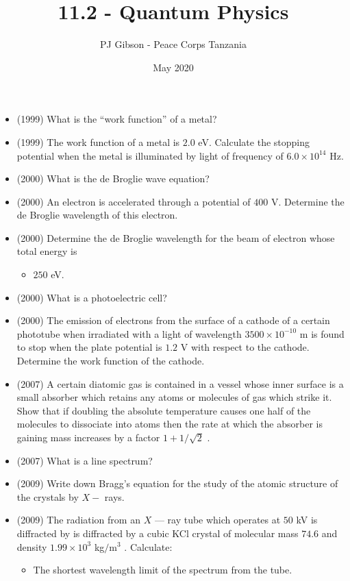 \documentclass{article}
\title{\textbf{11.2 - Quantum Physics}}
\author{PJ Gibson - Peace Corps Tanzania}
\date{May 2020}
\begin{document}
\maketitle

\begin{itemize}
\item (1999)  What is the “work function” of a metal?
\item (1999)  The work function of a metal is $ 2.0$ eV. Calculate the stopping potential when the metal is illuminated by light of frequency of $ 6.0 \times 10^{14}$ Hz.
\item (2000)  What is the de Broglie wave equation?
\item (2000)  An electron is accelerated through a potential of $ 400$ V. Determine the de Broglie wavelength of this electron.
\item (2000)  Determine the de Broglie wavelength for the beam of electron whose total energy is
 \begin{itemize}
\item $ 250$ eV.
\end{itemize}
\item (2000)  What is a photoelectric cell?
\item (2000)  The emission of electrons from the surface of a cathode of a certain phototube when irradiated with a light of wavelength $ 3500 \times 10^{-10}$ m is found to stop when the plate potential is $ 1.2$ V with respect to the cathode. Determine the work function of the cathode.
\item (2007)  A certain diatomic gas is contained in a vessel whose inner surface is a small absorber which retains any atoms or molecules of gas which strike it.  Show that if doubling the absolute temperature causes one half of the molecules to dissociate into atoms then the rate at which the absorber is gaining mass increases by a factor $ 1+1/\sqrt{2}$ .
\item (2007)  What is a line spectrum? 
\item (2009)  Write down Bragg’s equation for the study of the atomic structure of the crystals by $ X-$ rays.
\item (2009)  The radiation from an $ X$ — ray tube which operates at $ 50$ kV is diffracted by is diffracted by a cubic KCl crystal of molecular mass $ 74.6$ and density $ 1.99 \times 10^{3}$ kg$/$m$ ^{3}$ .  Calculate:
 \begin{itemize}
\item The shortest wavelength limit of the spectrum from the tube.

\end{itemize}
\end{itemize}
\end{document}
